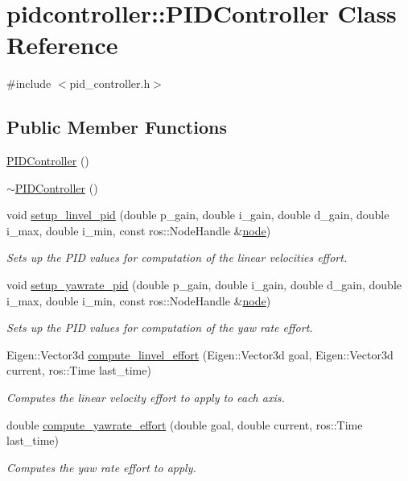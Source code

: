 \hypertarget{classpidcontroller_1_1PIDController}{}\section{pidcontroller\+::P\+I\+D\+Controller Class Reference}
\label{classpidcontroller_1_1PIDController}


{\ttfamily \#include $<$pid\+\_\+controller.\+h$>$}

\subsection*{Public Member Functions}
\begin{DoxyCompactItemize}
\item 
\mbox{\hyperlink{group__test__utils_ga67cc314aa5b3b4e9c47ac414b3a4c008}{P\+I\+D\+Controller}} ()
\item 
\mbox{\hyperlink{group__test__utils_ga4ae30cc03173417fa6edb5c055966a3f}{$\sim$\+P\+I\+D\+Controller}} ()
\item 
void \mbox{\hyperlink{group__test__utils_ga845b866b1ae4b73e39e4ca42395750b3}{setup\+\_\+linvel\+\_\+pid}} (double p\+\_\+gain, double i\+\_\+gain, double d\+\_\+gain, double i\+\_\+max, double i\+\_\+min, const ros\+::\+Node\+Handle \&\mbox{\hyperlink{structnode}{node}})
\begin{DoxyCompactList}\small\item\em Sets up the P\+ID values for computation of the linear velocities effort. \end{DoxyCompactList}\item 
void \mbox{\hyperlink{group__test__utils_ga5d8a387440921ea68907364c0e1d7b5b}{setup\+\_\+yawrate\+\_\+pid}} (double p\+\_\+gain, double i\+\_\+gain, double d\+\_\+gain, double i\+\_\+max, double i\+\_\+min, const ros\+::\+Node\+Handle \&\mbox{\hyperlink{structnode}{node}})
\begin{DoxyCompactList}\small\item\em Sets up the P\+ID values for computation of the yaw rate effort. \end{DoxyCompactList}\item 
Eigen\+::\+Vector3d \mbox{\hyperlink{group__test__utils_gac62955a265057681e6399488ced3471a}{compute\+\_\+linvel\+\_\+effort}} (Eigen\+::\+Vector3d goal, Eigen\+::\+Vector3d current, ros\+::\+Time last\+\_\+time)
\begin{DoxyCompactList}\small\item\em Computes the linear velocity effort to apply to each axis. \end{DoxyCompactList}\item 
double \mbox{\hyperlink{group__test__utils_gaee16eb0d9a067ac80a1d92e50991b60b}{compute\+\_\+yawrate\+\_\+effort}} (double goal, double current, ros\+::\+Time last\+\_\+time)
\begin{DoxyCompactList}\small\item\em Computes the yaw rate effort to apply. \end{DoxyCompactList}\end{DoxyCompactItemize}


